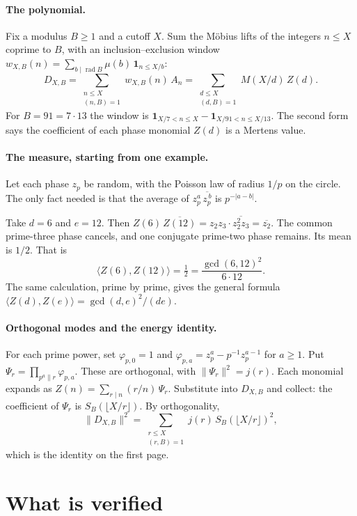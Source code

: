 \documentclass[11pt]{article}
\begin{document}
\paragraph{The polynomial.} Fix a modulus $B \ge 1$ and a cutoff $X$. Sum the M\"obius lifts of the integers $n \le X$ coprime to $B$, with an inclusion--exclusion window $w_{X,B}(n) = \sum_{b \mid \operatorname{rad} B} \mu(b)\,\mathbf 1_{n \le X/b}$:
\[
D_{X,B} = \sum_{\substack{n \le X\\(n,B)=1}} w_{X,B}(n)\, A_n = \sum_{\substack{d \le X\\(d,B)=1}} M(X/d)\, Z(d).
\]
For $B = 91 = 7\cdot 13$ the window is $\mathbf 1_{X/7 < n \le X} - \mathbf 1_{X/91 < n \le X/13}$. The second form says the coefficient of each phase monomial $Z(d)$ is a Mertens value.

\paragraph{The measure, starting from one example.} Let each phase $z_p$ be random, with the Poisson law of radius $1/p$ on the circle. The only fact needed is that the average of $z_p^a\,\overline{z_p^{\,b}}$ is $p^{-|a-b|}$.

Take $d = 6$ and $e = 12$. Then $Z(6)\,\overline{Z(12)} = z_2 z_3 \cdot \overline{z_2^2 z_3} = \overline{z_2}$. The common prime-three phase cancels, and one conjugate prime-two phase remains. Its mean is $1/2$. That is
\[
\langle Z(6), Z(12)\rangle = \tfrac12 = \frac{\gcd(6,12)^2}{6\cdot 12}.
\]
The same calculation, prime by prime, gives the general formula $\langle Z(d), Z(e)\rangle = \gcd(d,e)^2/(de)$.

\paragraph{Orthogonal modes and the energy identity.} For each prime power, set $\varphi_{p,0} = 1$ and $\varphi_{p,a} = z_p^a - p^{-1} z_p^{a-1}$ for $a \ge 1$. Put $\Psi_r = \prod_{p^a \parallel r} \varphi_{p,a}$. These are orthogonal, with $\|\Psi_r\|^2 = j(r)$. Each monomial expands as $Z(n) = \sum_{r \mid n} (r/n)\,\Psi_r$. Substitute into $D_{X,B}$ and collect: the coefficient of $\Psi_r$ is $S_B(\lfloor X/r \rfloor)$. By orthogonality,
\[
\|D_{X,B}\|^2 = \sum_{\substack{r \le X\\(r,B)=1}} j(r)\, S_B(\lfloor X/r\rfloor)^2,
\]
which is the identity on the first page.

\section{What is verified}
\end{document}
